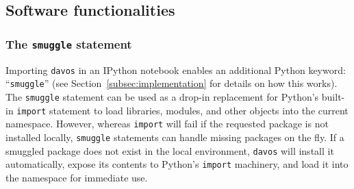 \documentclass[preprint,12pt,a4paper]{elsarticle}
\begin{document}
\subsection{Software functionalities}
\subsubsection{The \texttt{smuggle} statement}\label{subsec:smuggle}
Importing \texttt{davos} in an IPython notebook enables an additional Python keyword: ``\texttt{smuggle}'' (see Section~\ref{subsec:implementation} for details on how this works).
The \texttt{smuggle} statement can be used as a drop-in replacement for Python's built-in \texttt{import} statement to load libraries, modules, and other objects into the current namespace.
However, whereas \texttt{import} will fail if the requested package is not installed locally, \texttt{smuggle} statements can handle missing packages on the fly.
If a smuggled package does not exist in the local environment, \texttt{davos} will install it automatically, expose its contents to Python's \texttt{import} machinery, and load it into the namespace for immediate use.
\end{document}
